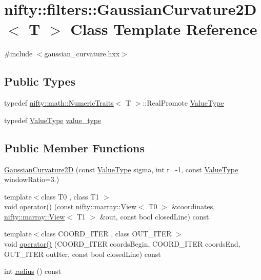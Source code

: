 \hypertarget{classnifty_1_1filters_1_1GaussianCurvature2D}{}\section{nifty\+:\+:filters\+:\+:Gaussian\+Curvature2D$<$ T $>$ Class Template Reference}
\label{classnifty_1_1filters_1_1GaussianCurvature2D}


{\ttfamily \#include $<$gaussian\+\_\+curvature.\+hxx$>$}

\subsection*{Public Types}
\begin{DoxyCompactItemize}
\item 
typedef \hyperlink{structnifty_1_1math_1_1NumericTraits}{nifty\+::math\+::\+Numeric\+Traits}$<$ T $>$\+::Real\+Promote \hyperlink{classnifty_1_1filters_1_1GaussianCurvature2D_af2739080c97506f5e72ebd4e69652311}{Value\+Type}
\item 
typedef \hyperlink{classnifty_1_1filters_1_1GaussianCurvature2D_af2739080c97506f5e72ebd4e69652311}{Value\+Type} \hyperlink{classnifty_1_1filters_1_1GaussianCurvature2D_affdbbda626530a7cd63878ca62f3682b}{value\+\_\+type}
\end{DoxyCompactItemize}
\subsection*{Public Member Functions}
\begin{DoxyCompactItemize}
\item 
\hyperlink{classnifty_1_1filters_1_1GaussianCurvature2D_a7405c5ba396d45a1f3e68db31835149e}{Gaussian\+Curvature2D} (const \hyperlink{classnifty_1_1filters_1_1GaussianCurvature2D_af2739080c97506f5e72ebd4e69652311}{Value\+Type} sigma, int r=-\/1, const \hyperlink{classnifty_1_1filters_1_1GaussianCurvature2D_af2739080c97506f5e72ebd4e69652311}{Value\+Type} window\+Ratio=3.)
\item 
{\footnotesize template$<$class T0 , class T1 $>$ }\\void \hyperlink{classnifty_1_1filters_1_1GaussianCurvature2D_a46b578ba29e351dd59552ca1fafd11ae}{operator()} (const \hyperlink{classandres_1_1View}{nifty\+::marray\+::\+View}$<$ T0 $>$ \&coordinates, \hyperlink{classandres_1_1View}{nifty\+::marray\+::\+View}$<$ T1 $>$ \&out, const bool closed\+Line) const
\item 
{\footnotesize template$<$class C\+O\+O\+R\+D\+\_\+\+I\+T\+ER , class O\+U\+T\+\_\+\+I\+T\+ER $>$ }\\void \hyperlink{classnifty_1_1filters_1_1GaussianCurvature2D_ab4db1b2a7b3a72cb2861f2aa828d3573}{operator()} (C\+O\+O\+R\+D\+\_\+\+I\+T\+ER coords\+Begin, C\+O\+O\+R\+D\+\_\+\+I\+T\+ER coords\+End, O\+U\+T\+\_\+\+I\+T\+ER out\+Iter, const bool closed\+Line) const
\item 
int \hyperlink{classnifty_1_1filters_1_1GaussianCurvature2D_a75235b815cc479bbd34cf75118fb82d3}{radius} () const
\end{DoxyCompactItemize}


